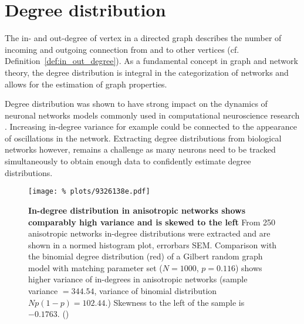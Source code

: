 

\section{Degree distribution}\label{sec:degree_distribution}

The in- and out-degree of vertex in a directed graph describes the
number of incoming and outgoing connection from and to other vertices
(cf. Definition~\ref{def:in_out_degree}). As a fundamental concept in
graph and network theory, the degree distribution is integral in the
categorization of networks and allows for the estimation of graph
properties.

Degree distribution was shown to have strong impact on the dynamics of
neuronal networks models commonly used in computational neuroscience
research \parencite{Roxin2011}. Increasing in-degree variance for
example could be connected to the appearance of oscillations in the
network. Extracting degree distributions from biological networks
however, remains a challenge as many neurons need to be tracked
simultaneously to obtain enough data to confidently estimate degree
distributions. 

\begin{figure}[H]
  \centering
  \texttt{[image: \%
    plots/9326138e.pdf]}
  \caption{\textbf{In-degree distribution in anisotropic networks
      shows comparably high variance and is skewed to the left} From 250
    anisotropic networks in-degree distributions were extracted and
    are shown in a normed histogram plot, errorbars SEM. Comparison with the
    binomial degree distribution (red) of a Gilbert random graph model
    with matching parameter set ($N=1000$, $p =0.116$) shows higher
    variance of in-degrees in anisotropic networks (sample variance $=
    344.54$, variance of binomial distribution $Np(1-p) = 102.44$.)
    Skewness to the left of the sample is $-0.1763.$
    ()}
  \label{fig:in_degree_ER_compare}
\end{figure}


